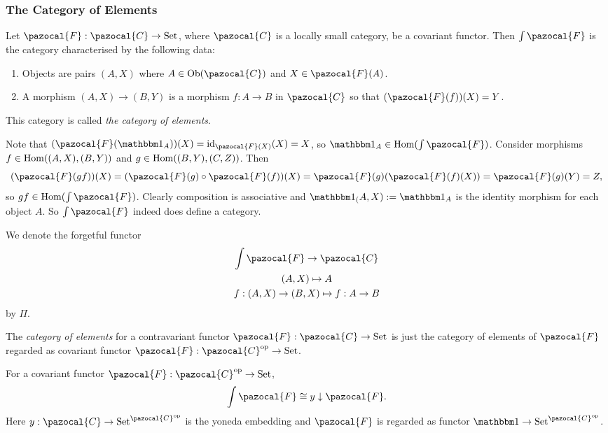 \subsubsection{The Category of Elements}
\begin{definition}
    Let $\pazocal{F}: \pazocal{C}\rightarrow\mathrm{Set}$, where $\pazocal{C}$ is a locally small category, be a covariant functor. Then $\int \pazocal{F}$ is the category characterised by the following data: 
    \begin{enumerate}
        \item Objects are pairs $(A,X)$ where $A\in \Ob(\pazocal{C})$ and $X\in \pazocal{F}(A)$.
        \item A morphism $(A,X)\rightarrow (B,Y)$ is a morphism $f: A\rightarrow B$ in $\pazocal{C}$ so that $(\pazocal{F}(f))(X)=Y$.
    \end{enumerate} 
    This category is called \emph{the category of elements}.
\end{definition}
\begin{remark}
    Note that $(\pazocal{F}(\fone_A))(X)=\id_{\pazocal{F}(X)}(X)=X$, so $\fone_A\in \Hom(\int\pazocal{F})$. Consider morphisms $f\in \mathrm{Hom}((A,X),(B,Y))$ and $g\in \mathrm{Hom}((B,Y),(C,Z))$. Then 
    $$(\pazocal{F}(gf))(X)=(\pazocal{F}(g)\circ \pazocal{F}(f))(X)= \pazocal{F}(g)(\pazocal{F}(f)(X))=\pazocal{F}(g)(Y)=Z,$$
    so $gf\in \Hom(\int\pazocal{F})$. Clearly composition is associative and $\fone_(A,X):=\fone_A$ is the identity morphism for each object $A$. So $\int\pazocal{F}$ indeed does define a category.
\end{remark}
We denote the forgetful functor 
\begin{gather*}
    \int\pazocal{F} \rightarrow \pazocal{C}\\
    (A,X)\mapsto A\\
    f: (A,X)\rightarrow (B,X) \mapsto f: A\rightarrow B
\end{gather*}
by $\Pi$. 
\begin{definition}
    The \emph{category of elements} for a contravariant functor $\pazocal{F}:\pazocal{C}\rightarrow \mathrm{Set}$ is just the category of elements of $\pazocal{F}$ regarded as covariant functor $\pazocal{F} :\pazocal{C}\op\rightarrow \mathrm{Set}$.
\end{definition}
\begin{lemma}
    For a covariant functor $\pazocal{F}:\pazocal{C}\op \rightarrow \mathrm{Set}$, 
    $$\int\pazocal{F} \cong y \downarrow \pazocal{F}.$$
    Here $y: \pazocal{C}\rightarrow \mathrm{Set}^{\pazocal{C}\op}$ is the yoneda embedding and $\pazocal{F}$ is regarded as functor $\fone\rightarrow \mathrm{Set}^{\pazocal{C}\op}$.
\end{lemma}
